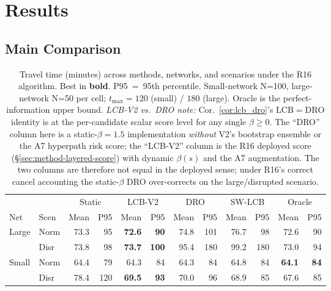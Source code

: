 \documentclass[11pt]{article}
\theoremstyle{definition}
\theoremstyle{remark}
\begin{document}
\section{Results}
\label{sec:results}

\subsection{Main Comparison}

\begin{table}[t]
\centering
\caption{Travel time (minutes) across methods, networks, and scenarios
under the R16 algorithm. Best in \textbf{bold}. P95~=~95th percentile.
Small-network N{=}100, large-network N{=}50 per cell;
$t_{\max}{=}120$ (small) / $180$ (large). Oracle is the
perfect-information upper bound. \emph{LCB-V2 vs.\ DRO note:}
Cor.~\ref{cor:lcb_dro}'s $\mathrm{LCB}\!=\!\mathrm{DRO}$ identity
is at the per-candidate scalar score level for any single
$\beta\geq 0$. The ``DRO'' column here is a static-$\beta\!=\!1.5$
implementation \emph{without} V2's bootstrap ensemble or the
A7 hyperpath risk score; the ``LCB-V2'' column is the R16 deployed
score (\S\ref{sec:method-layered-score}) with dynamic $\beta(s)$ and
the A7 augmentation. The two columns are therefore not equal in
the deployed sense; under R16's correct cancel accounting the
static-$\beta$ DRO over-corrects on the large/disrupted scenario.}
\label{tab:main}
\begin{tabular}{ll rrrrrrrr rr}
\toprule
& & \multicolumn{2}{c}{Static} & \multicolumn{2}{c}{LCB-V2} & \multicolumn{2}{c}{DRO} & \multicolumn{2}{c}{SW-LCB} & \multicolumn{2}{c}{Oracle} \\
\cmidrule(lr){3-4}\cmidrule(lr){5-6}\cmidrule(lr){7-8}\cmidrule(lr){9-10}\cmidrule(lr){11-12}
Net & Scen & Mean & P95 & Mean & P95 & Mean & P95 & Mean & P95 & Mean & P95 \\
\midrule
\multirow{2}{*}{Large} & Norm & 73.3 & 95 & \textbf{72.6} & \textbf{90} & 74.8 & 101 & 76.7 & 98 & 72.6 & 90 \\
& Disr & 73.8 & 98 & \textbf{73.7} & \textbf{100} & 95.4 & 180 & 99.2 & 180 & 73.0 & 94 \\
\midrule
\multirow{2}{*}{Small} & Norm & 64.4 & 79 & 64.3 & 84 & 64.3 & 84 & 64.8 & 84 & \textbf{64.1} & \textbf{84} \\
& Disr & 78.4 & 120 & \textbf{69.5} & \textbf{93} & 70.0 & 96 & 68.9 & 85 & 67.6 & 85 \\
\bottomrule
\end{tabular}
\end{table}
\end{document}
